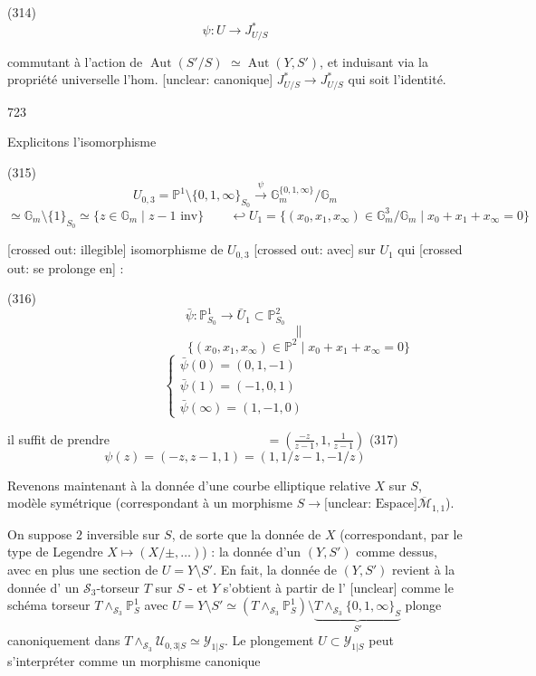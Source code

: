 (314) $$\psi: U \longrightarrow J^*_{U/S}$$

commutant à l'action de $\operatorname{Aut}(S'/S)$
$\simeq \operatorname{Aut}(Y, S')$, et induisant via la
propriété universelle l'hom. [unclear: canonique]
$J^*_{U/S} \to J^*_{U/S}$ qui soit l'identité.

\newpage


723

Explicitons l'isomorphisme

(315) $$U_{0,3} = \mathbb{P}^1 \setminus \{0,1,\infty\}_{S_0} \stackrel{\psi}{\longrightarrow} \mathbb{G}_m^{\{0,1,\infty\}} / \mathbb{G}_m$$
$$ \simeq \mathbb{G}_m \setminus \{1\}_{S_0} \simeq \{z \in \mathbb{G}_m \mid z-1 \text{ inv}\} \qquad \hookleftarrow U_1 = \{ (x_0, x_1, x_\infty) \in \mathbb{G}_m^3 / \mathbb{G}_m \mid x_0 + x_1 + x_\infty = 0 \}$$

[crossed out: illegible] isomorphisme de $U_{0,3}$ [crossed out: avec] sur $U_1$ qui
[crossed out: se prolonge en] :

(316) 
$$ \bar{\psi} : \mathbb{P}^1_{S_0} \longrightarrow \bar{U}_1 \subset \mathbb{P}^2_{S_0}$$
$$ \qquad\qquad\qquad\qquad\qquad \| $$
$$ \qquad\qquad\qquad\qquad\qquad \{ (x_0, x_1, x_\infty) \in \mathbb{P}^2 \mid x_0 + x_1 + x_\infty = 0 \} $$
$$ \begin{cases} \bar{\psi}(0) = (0, 1, -1) \\ \bar{\psi}(1) = (-1, 0, 1) \\ \bar{\psi}(\infty) = (1, -1, 0) \end{cases} $$

il suffit de prendre $\qquad\qquad\qquad\qquad\qquad\qquad = (\frac{-z}{z-1}, 1, \frac{1}{z-1})$
(317) $$ \psi(z) = (-z, z-1, 1) = (1, 1/z - 1, -1/z) $$

Revenons maintenant à la donnée d'une courbe elliptique relative $X$ sur $S$, modèle symétrique (correspondant à un morphisme $S \to \text{[unclear: Espace]} \overline{\mathcal{M}}_{1,1}$).

\newpage


On suppose $2$ inversible sur $S$, de sorte que
la donnée de $X$ (correspondant, par le
type de Legendre $X \longmapsto (X/\pm, \dots)$)
: la donnée d'un $(Y,S')$ comme dessus,
avec en plus une section de $U=Y \setminus S'$.
En fait, la donnée de $(Y,S')$ revient
à la donnée d' un $\mathcal{S}_3$-torseur
$T$ sur $S$ - et $Y$ s'obtient à
partir de l' [unclear] comme le schéma
torseur $T \wedge_{\mathcal{S}_3} \mathbb{P}^1_S$
avec $U = Y \setminus S' \simeq (T \wedge_{\mathcal{S}_3} \mathbb{P}^1_S) \setminus \underbrace{T \wedge_{\mathcal{S}_3} \{0,1,\infty\}_S}_{S'}$
plonge canoniquement dans
$T \wedge_{\mathcal{S}_3} \mathcal{U}_{0,3|S} \simeq \mathcal{Y}_{1|S}$. Le plongement
$U \subset \mathcal{Y}_{1|S}$ peut s'interpréter 
comme un morphisme canonique

